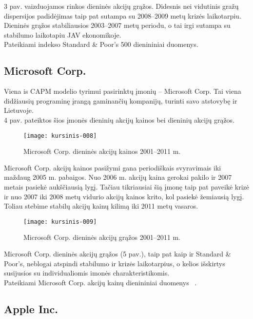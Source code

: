 \documentclass[12pt, a14paper, lithuanian]{article}
\begin{document}
3 pav. vaizduojamos rinkos dieninės akcijų grąžos. Didesnis nei vidutinis gražų dispersijos padidėjimas
taip pat sutampa su 2008--2009 metų krizės laikotarpiu. Dieninės grąžos stabiliausios 2003--2007 metų periodu,
o tai irgi sutampa su stabilumo laikotapiu JAV ekonomikoje.    \\

Pateikiami indekso Standard \& Poor's 500 dienininiai duomenys\cite{market}.

\subsection{Microsoft Corp.}

Viena is CAPM modelio tyrimui pasirinktų įmonių -- Microsoft Corp. Tai viena didžiausių programinę įrangą
 gaminančių kompanijų, turinti savo atstovybę ir Lietuvoje. \\
 
 4 pav. pateiktos šios įmonės dieninių akcijų kainos
 bei dieninių akcijų grąžos.
 
\begin{figure}[H]
  \centering
\texttt{[image: kursinis-008]}
  \caption{Microsoft Corp. dieninės akcijų kainos 2001--2011 m.}
  \label{fig:4}
\end{figure}

Microsoft Corp. akcijų kainos pasižymi gana periodiškais svyravimais iki maždaug 2005 m. pabaigos. Nuo 2006 m.
akcijų kaina gerokai pakilo ir 2007 metais pasiekė aukščiausią lygį. Tačiau tikriausiai šią įmonę taip pat paveikė
krizė ir nuo 2007 iki 2008 metų vidurio akcijų kainos krito, kol pasiekė žemiausią lygį. Toliau stebime stabilų
akcijų kainų kilimą iki 2011 metų vasaros.

\begin{figure}[H]
  \centering
\texttt{[image: kursinis-009]}
  \caption{Microsoft Corp. dieninės akcijų grąžos 2001--2011 m. }
  \label{fig:5}
\end{figure}
             
Microsoft Corp. dieninės akcijų grąžos (5 pav.), taip pat kaip ir Standard \& Poor's, neblogai atspindi stabilumo ir
krizės laikotarpius, o kelios išskirtys susijusios su individualiomis imonės charakteristikomis. \\

Pateikiami Microsoft Corp. akcijų kainų dienininiai duomenys~\cite{microsoft} .


\subsection{Apple Inc.}
\end{document}
